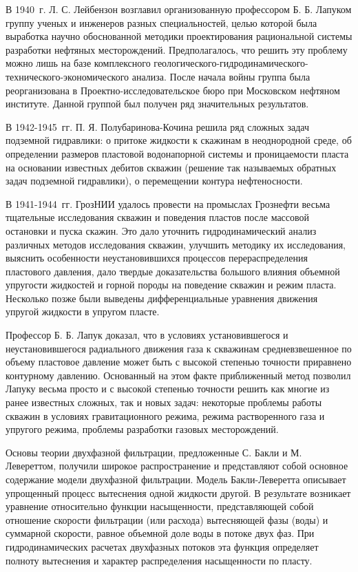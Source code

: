 В 1940~г. Л. С. Лейбензон возглавил организованную профессором Б. Б. Лапуком группу ученых и инженеров разных специальностей, целью которой была выработка научно обоснованной методики проектирования рациональной
системы разработки нефтяных месторождений. Предполагалось, что решить эту проблему можно лишь на базе комплексного геологического-гидродинамического-технического-экономического анализа. После начала войны группа была 
реорганизована в Проектно-исследовательское бюро при Московском нефтяном институте. Данной группой был получен ряд значительных результатов. 

В 1942-1945~гг. П. Я. Полубаринова-Кочина решила ряд сложных задач подземной гидравлики: о притоке жидкости к скажинам в неоднородной среде, об определении размеров пластовой водонапорной системы и проницаемости пласта
на основании известных дебитов скважин (решение так называемых обратных задач подземной гидравлики), о перемещении контура нефтеносности.

В 1941-1944~гг. ГрозНИИ удалось провести на промыслах Грознефти весьма тщательные исследования скважин и поведения пластов после массовой остановки и пуска скажин. Это дало уточнить гидродинамический анализ различных
методов исследования скважин, улучшить методику их исследования, выяснить особенности неустановившихся процессов перераспределения пластового давления, дало твердые доказательства большого влияния объемной упругости
жидкостей и горной породы на поведение скважин и режим пласта. Несколько позже были выведены дифференциальные уравнения движения упругой жидкости в упругом пласте.

Профессор Б. Б. Лапук доказал, что в условиях установившегося и неустановившегося радиального движения газа к скважинам средневзвешенное по объему пластовое давление может быть с высокой степенью точности приравнено
контурному давлению. Основанный на этом факте приближенный метод позволил Лапуку весьма просто и с высокой степенью точности решить как многие из ранее известных сложных, так и новых задач: некоторые проблемы работы скважин в условиях
гравитационного режима, режима растворенного газа и упругого режима, проблемы разработки газовых месторождений.

Основы теории двухфазной фильтрации, предложенные С. Бакли и М. Левереттом, получили широкое распространение и представляют собой основное содержание модели двухфазной фильтрации. Модель Бакли-Леверетта описывает
упрощенный процесс вытеснения одной жидкости другой. В результате возникает уравнение относительно функции насыщенности, представляющей собой отношение скорости фильтрации (или расхода) вытесняющей фазы (воды) и
суммарной скорости, равное объемной доле воды в потоке двух фаз. При гидродинамических расчетах двухфазных потоков эта функция определяет полноту вытеснения и характер распределения насыщенности по пласту.

